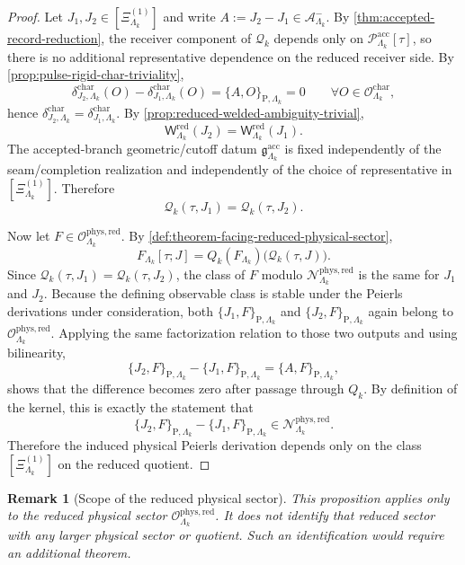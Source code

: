 \documentclass[11pt]{article}
\newtheorem{remark}[theorem]{Remark}
\theoremstyle{definition}
\begin{document}
\begin{proof}
Let \(J_1,J_2\in[\Xi^{(1)}_{\Lambda_k}]\) and write
\(
A:=J_2-J_1\in\mathcal A^-_{\Lambda_k}
\).
By \cref{thm:accepted-record-reduction}, the receiver component of \(\mathcal Q_k\) depends only on
\(\mathcal P^{\mathrm{acc}}_{\Lambda_k}[\tau]\), so there is no additional representative dependence on
the reduced receiver side.
By \cref{prop:pulse-rigid-char-triviality},
\[
\delta^{\mathrm{char}}_{J_2,\Lambda_k}(O)
-\delta^{\mathrm{char}}_{J_1,\Lambda_k}(O)
=
\{A,O\}_{\mathrm P,\Lambda_k}
=
0
\qquad
\forall O\in\mathcal O^{\mathrm{char}}_{\Lambda_k},
\]
hence
\(
\delta^{\mathrm{char}}_{J_2,\Lambda_k}
=
\delta^{\mathrm{char}}_{J_1,\Lambda_k}
\).
By \cref{prop:reduced-welded-ambiguity-trivial},
\[
\mathsf W^{\mathrm{red}}_{\Lambda_k}(J_2)
=
\mathsf W^{\mathrm{red}}_{\Lambda_k}(J_1).
\]
The accepted-branch geometric/cutoff datum \(\mathfrak g^{\mathrm{acc}}_{\Lambda_k}\) is fixed
independently of the seam/completion realization and independently of the choice of representative in
\([\Xi^{(1)}_{\Lambda_k}]\).
Therefore
\[
\mathcal Q_k(\tau,J_1)
=
\mathcal Q_k(\tau,J_2).
\]

Now let \(F\in\mathcal O^{\mathrm{phys,red}}_{\Lambda_k}\).
By \cref{def:theorem-facing-reduced-physical-sector},
\[
F_{\Lambda_k}[\tau;J]
=
Q_k(F_{\Lambda_k})\!\big(\mathcal Q_k(\tau,J)\big).
\]
Since \(\mathcal Q_k(\tau,J_1)=\mathcal Q_k(\tau,J_2)\), the class of \(F\) modulo
\(\mathcal N^{\mathrm{phys,red}}_{\Lambda_k}\) is the same for \(J_1\) and \(J_2\).
Because the defining observable class is stable under the Peierls derivations under consideration,
both \(\{J_1,F\}_{\mathrm P,\Lambda_k}\) and \(\{J_2,F\}_{\mathrm P,\Lambda_k}\) again belong to
\(\mathcal O^{\mathrm{phys,red}}_{\Lambda_k}\).
Applying the same factorization relation to those two outputs and using bilinearity,
\[
\{J_2,F\}_{\mathrm P,\Lambda_k}
-\{J_1,F\}_{\mathrm P,\Lambda_k}
=
\{A,F\}_{\mathrm P,\Lambda_k},
\]
shows that the difference becomes zero after passage through \(Q_k\).
By definition of the kernel, this is exactly the statement that
\[
\{J_2,F\}_{\mathrm P,\Lambda_k}
-\{J_1,F\}_{\mathrm P,\Lambda_k}
\in
\mathcal N^{\mathrm{phys,red}}_{\Lambda_k}.
\]
Therefore the induced physical Peierls derivation depends only on the class
\([\Xi^{(1)}_{\Lambda_k}]\) on the reduced quotient.
\end{proof}

\begin{remark}[Scope of the reduced physical sector]
\label{rem:full-sector-gap}
This proposition applies only to the reduced physical sector
\(\mathcal O^{\mathrm{phys,red}}_{\Lambda_k}\).
It does \emph{not} identify that reduced sector with any larger physical sector or quotient.
Such an identification would require an additional theorem.
\end{remark}
\end{document}
